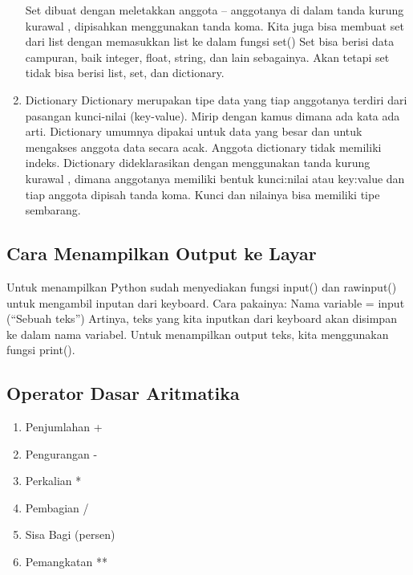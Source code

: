 \begin{enumerate}
Set dibuat dengan meletakkan anggota – anggotanya di dalam tanda kurung kurawal { }, dipisahkan menggunakan tanda koma. Kita juga bisa membuat set dari list dengan memasukkan list ke dalam fungsi set()
Set bisa berisi data campuran, baik integer, float, string, dan lain sebagainya. Akan tetapi set tidak bisa berisi list, set, dan dictionary.
\item
Dictionary
Dictionary merupakan tipe data yang tiap anggotanya terdiri dari pasangan kunci-nilai (key-value). Mirip dengan kamus dimana ada kata ada arti. Dictionary umumnya dipakai untuk data yang besar dan untuk mengakses anggota data secara acak. Anggota dictionary tidak memiliki indeks.
Dictionary dideklarasikan dengan menggunakan tanda kurung kurawal { }, dimana anggotanya memiliki bentuk kunci:nilai atau key:value dan tiap anggota dipisah tanda koma. Kunci dan nilainya bisa memiliki tipe sembarang.
\end{enumerate}
\subsection{Cara Menampilkan Output ke Layar}
	Untuk menampilkan Python sudah menyediakan fungsi input() dan rawinput() untuk mengambil inputan dari keyboard.
Cara pakainya: 
Nama variable = input (“Sebuah teks”)
Artinya, teks yang kita inputkan dari keyboard akan disimpan ke dalam nama variabel.
Untuk menampilkan output teks, kita menggunakan fungsi print().
\subsection{Operator Dasar Aritmatika}
\begin{enumerate}
\item
Penjumlahan	+
\item
Pengurangan	-
\item
Perkalian	*
\item
Pembagian	/
\item
Sisa Bagi	(persen)
\item
Pemangkatan	**
\end{enumerate}
